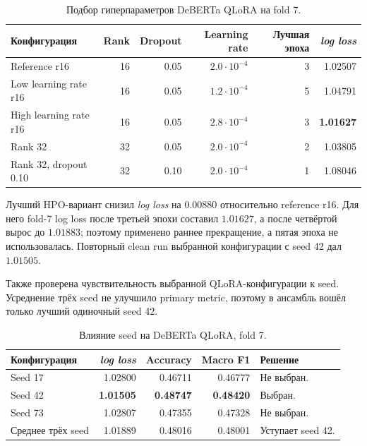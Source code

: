 \documentclass[a4paper,11pt]{article}
\newcommand{\metric}{\textit{log loss}}
\begin{document}
\begin{table}[htbp]
\centering
\caption{Подбор гиперпараметров DeBERTa QLoRA на fold 7.}
\label{tab:qlora-hpo}
\small
\begin{tabularx}{\textwidth}{|Y|R|R|R|R|R|}
\hline
{} Конфигурация & Rank & Dropout & Learning rate & Лучшая эпоха & \metric \\ \hline
Reference r16 & 16 & 0.05 & $2.0\cdot10^{-4}$ & 3 & 1.02507 \\ \hline
Low learning rate r16 & 16 & 0.05 & $1.2\cdot10^{-4}$ & 5 & 1.04791 \\ \hline
High learning rate r16 & 16 & 0.05 & $2.8\cdot10^{-4}$ & 3 & \textbf{1.01627} \\ \hline
Rank 32 & 32 & 0.05 & $2.0\cdot10^{-4}$ & 2 & 1.03805 \\ \hline
Rank 32, dropout 0.10 & 32 & 0.10 & $2.0\cdot10^{-4}$ & 1 & 1.08046 \\ \hline
\end{tabularx}
\end{table}

Лучший HPO-вариант снизил \metric{} на $0.00880$ относительно reference r16.
Для него fold-7 log loss после третьей эпохи составил $1.01627$, а после
четвёртой вырос до $1.01883$; поэтому применено раннее прекращение, а пятая
эпоха не использовалась. Повторный clean run выбранной конфигурации с seed 42
дал $1.01505$.

Также проверена чувствительность выбранной QLoRA-конфигурации к seed.
Усреднение трёх seed не улучшило primary metric, поэтому в ансамбль вошёл
только лучший одиночный seed 42.

\begin{table}[htbp]
\centering
\caption{Влияние seed на DeBERTa QLoRA, fold 7.}
\label{tab:seeds}
\small
\begin{tabularx}{\textwidth}{|Y|R|R|R|Y|}
\hline
{} Конфигурация & \metric & Accuracy & Macro F1 & Решение \\ \hline
Seed 17 & 1.02800 & 0.46711 & 0.46777 & Не выбран. \\ \hline
Seed 42 & \textbf{1.01505} & \textbf{0.48747} & \textbf{0.48420} & Выбран. \\ \hline
Seed 73 & 1.02807 & 0.47355 & 0.47328 & Не выбран. \\ \hline
Среднее трёх seed & 1.01889 & 0.48016 & 0.48001 & Уступает seed 42. \\ \hline
\end{tabularx}
\end{table}
\end{document}
